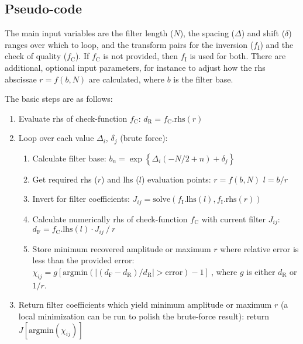 \documentclass[paper,twocolumn,twoside]{geophysics}
\newcommand{\mr}[1]{\mathrm{#1}}
\begin{document}
\subsection{Pseudo-code}
The main input variables are the filter length ($N$), the spacing ($\Delta$)
and shift ($\delta$) ranges over which to loop, and the transform pairs for
the inversion ($f_\mr{I}$) and the check of quality ($f_\mr{C}$). If
$f_\mr{C}$ is not provided, then $f_\mr{I}$ is used for both. There are
additional, optional input parameters, for instance to adjust how the rhs
abscissae $r = f(b, N)$ are calculated, where $b$ is the filter base.

The basic steps are as follows:
\begin{enumerate}
  \item Evaluate rhs of check-function $f_\mr{C}$:\newline
        $d_\mr{R} = f_\mr{C}.\mr{rhs}(r)$
  \item Loop over each value $\Delta_i$, $\delta_j$ (brute force):
    \begin{enumerate}
      \item Calculate filter base:\newline
        $b_n = \exp\left\{\Delta_i(-N/2+n) + \delta_j\right\}$
      \item Get required rhs ($r$) and lhs ($l$) evaluation points:\newline
        $r = f(b, N)$\newline
        $l = b/r$
      \item Invert for filter coefficients:\newline
        $J_{ij} = \mr{solve}(f_\mr{I}.\mr{lhs}(l), f_\mr{I}.\mr{rhs}(r))$
    \item Calculate numerically rhs of check-function $f_\mr{C}$ with current
      filter $J_{ij}$:\newline
      $d_\mr{F} = f_\mr{C}.\mr{lhs}(l)\cdot J_{ij}\ /\ r$
      \item Store minimum recovered amplitude or maximum $r$ where relative
        error is less than the provided error:\newline
        $\chi_{ij} = g\left[
        \mr{argmin}\left(|(d_\mr{F}-d_\mr{R})/d_\mr{R}| >
        \mr{error}\right) -1\right]\ $, where $g$ is either $d_\mr{R}$
        or $1/r$.
    \end{enumerate}
  \item Return filter coefficients which yield minimum amplitude or maximum $r$
    (a local minimization can be run to polish the brute-force result):\newline
    return $J\left[\mr{argmin}(\chi_{ij})\right] $\newline
\end{enumerate}
\end{document}
